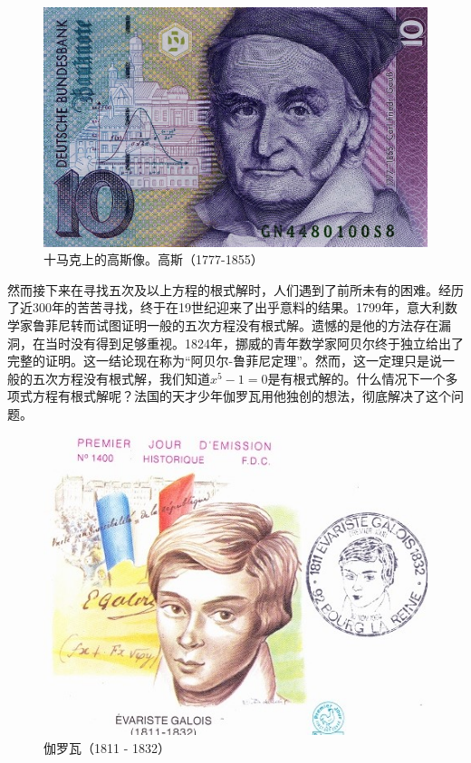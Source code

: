 \documentclass[b5paper]{ctexart}
\begin{document}
\begin{figure}[htbp]
 \centering
 \includegraphics[scale=0.25]{img/Gaus.jpg}
 \captionsetup{labelformat=empty}
 \caption{十马克上的高斯像。高斯（1777-1855）}
 \label{fig:Gauss}
\end{figure}

然而接下来在寻找五次及以上方程的根式解时，人们遇到了前所未有的困难。经历了近300年的苦苦寻找，终于在19世纪迎来了出乎意料的结果。1799年，意大利数学家鲁菲尼转而试图证明一般的五次方程没有根式解。遗憾的是他的方法存在漏洞，在当时没有得到足够重视。1824年，挪威的青年数学家阿贝尔终于独立给出了完整的证明。这一结论现在称为“阿贝尔-鲁菲尼定理”。然而，这一定理只是说一般的五次方程没有根式解，我们知道$x^5-1=0$是有根式解的。什么情况下一个多项式方程有根式解呢？法国的天才少年伽罗瓦用他独创的想法，彻底解决了这个问题\cite{Wiki-Galois-theory}。

\begin{figure}[htbp]
 \centering
 \includegraphics[scale=0.4]{img/galois.jpg}
 \captionsetup{labelformat=empty}
 \caption{伽罗瓦（1811 - 1832）}
 \label{fig:Galois}
\end{figure}
\end{document}
